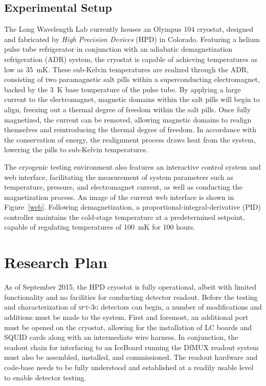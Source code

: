 \documentclass[preprint]{aastex}
\begin{document}
\subsection{Experimental Setup}

The Long Wavelength Lab currently houses an Olympus 104 cryostat, designed and fabricated by \textit{High Precision Devices} (HPD) in Colorado.  Featuring a helium pulse tube refrigerator in conjunction with an adiabatic demagnetization refrigeration (ADR) system, the cryostat is capable of achieving temperatures as low as 35~mK.  These sub-Kelvin temperatures are realized through the ADR, consisting of two paramagnetic salt pills within a superconducting electromagnet, backed by the 3~K base temperature of the pulse tube.  By applying a large current to the electromagnet, magnetic domains within the salt pills will begin to align, freezing out a thermal degree of freedom within the salt pills.  Once fully magnetized, the current can be removed, allowing magnetic domains to realign themselves and reintroducing the thermal degree of freedom.  In accordance with the conservation of energy, the realignment process draws heat from the system, lowering the pills to sub-Kelvin temperatures.

The cryogenic testing environment also features an interactive control system and web interface, facilitating the measurement of system parameters such as temperature, pressure, and electromagnet current, as well as conducting the magnetization process.   An image of the current web interface is shown in Figure~\ref{web}.  Following demagnetization, a proportional-integral-derivative (PID) controller maintains the cold-stage temperature at a predetermined setpoint, capable of regulating temperatures of 100~mK for 100 hours.

\section{Research Plan}

As of September 2015, the HPD cryostat is fully operational, albeit with limited functionality and no facilities for conducting detector readout.  Before the testing and characterization of \mbox{\textsc{spt-3g}} detectors can begin, a number of modifications and additions must be made to the system.  First and foremost, an additional port must be opened on the cryostat, allowing for the installation of LC boards and SQUID cards along with an intermediate wire harness.  In conjunction, the readout chain for interfacing to an IceBoard running the DfMUX readout system must also be assembled, installed, and commissioned.  The readout hardware and code-base needs to be fully understood and established at a readily usable level to enable detector testing.
\end{document}
